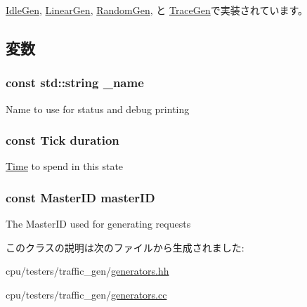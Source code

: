 \hyperlink{classIdleGen_a65f805b54c24ac3ce0a37716de3e8abc}{IdleGen}, \hyperlink{classLinearGen_a65f805b54c24ac3ce0a37716de3e8abc}{LinearGen}, \hyperlink{classRandomGen_a65f805b54c24ac3ce0a37716de3e8abc}{RandomGen}, と \hyperlink{classTraceGen_a65f805b54c24ac3ce0a37716de3e8abc}{TraceGen}で実装されています。

\subsection{変数}
\hypertarget{classBaseGen_a1b003dc5cfce1a4d8f9a0c4b9b589045}{
\subsubsection[{\_\-name}]{\setlength{\rightskip}{0pt plus 5cm}const std::string {\bf \_\-name}}}
\label{classBaseGen_a1b003dc5cfce1a4d8f9a0c4b9b589045}
Name to use for status and debug printing \hypertarget{classBaseGen_a8868e82db2ec9f48892f03bd5c3ae0e1}{
\subsubsection[{duration}]{\setlength{\rightskip}{0pt plus 5cm}const {\bf Tick} {\bf duration}}}
\label{classBaseGen_a8868e82db2ec9f48892f03bd5c3ae0e1}
\hyperlink{classTime}{Time} to spend in this state \hypertarget{classBaseGen_ac8d391dc05bee23af38946b9b3f80674}{
\subsubsection[{masterID}]{\setlength{\rightskip}{0pt plus 5cm}const {\bf MasterID} {\bf masterID}}}
\label{classBaseGen_ac8d391dc05bee23af38946b9b3f80674}
The MasterID used for generating requests 

このクラスの説明は次のファイルから生成されました:\begin{DoxyCompactItemize}
\item 
cpu/testers/traffic\_\-gen/\hyperlink{generators_8hh}{generators.hh}\item 
cpu/testers/traffic\_\-gen/\hyperlink{generators_8cc}{generators.cc}\end{DoxyCompactItemize}
